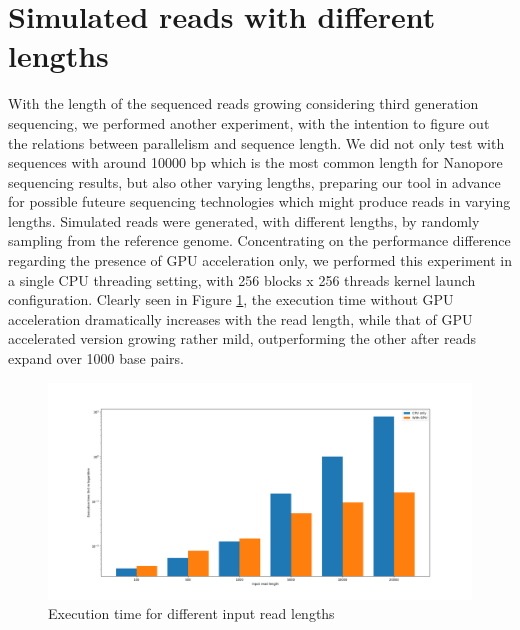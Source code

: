 \documentclass{PHlab-thesis}
\begin{document}
\section{Simulated reads with different lengths}
With the length of the sequenced reads growing considering third generation sequencing, we performed another experiment, with the intention to figure out the relations between parallelism and sequence length. We did not only test with sequences with around 10000 bp which is the most common length for Nanopore sequencing results, but also other varying lengths, preparing our tool in advance for possible futeure sequencing technologies which might produce reads in varying lengths. Simulated reads were generated, with different lengths, by randomly sampling from the reference genome. Concentrating on the performance difference regarding the presence of GPU acceleration only, we performed this experiment in a single CPU threading setting, with 256 blocks x 256 threads kernel launch configuration. Clearly seen in Figure \ref{fig:readlen}, the execution time without GPU acceleration dramatically increases with the read length, while that of GPU accelerated version growing rather mild, outperforming the other after reads expand over 1000 base pairs.
\begin{figure}
	\centering
	\includegraphics[scale=0.3]{figures/readlen.png}
	\caption{Execution time for different input read lengths}
	\label{fig:readlen} 
\end{figure}
\end{document}
